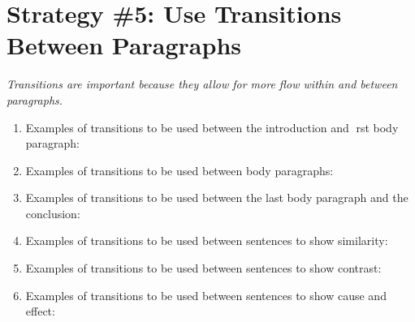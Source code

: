 \section{Strategy \#5: Use Transitions Between Paragraphs}

\textit{Transitions are important because they allow for more flow within and between paragraphs.}

\vfill
\begin{enumerate}
\item Examples of transitions to be used between the introduction and rst body paragraph:

\vfill

\item Examples of transitions to be used between body paragraphs:

\vfill

\item Examples of transitions to be used between the last body paragraph and the conclusion:

\vfill

\item  Examples of transitions to be used between sentences to show similarity:


\vfill

\item Examples of transitions to be used between sentences to show contrast:



\vfill

\item Examples of transitions to be used between sentences to show cause and effect:

\vfill

\end{enumerate}
